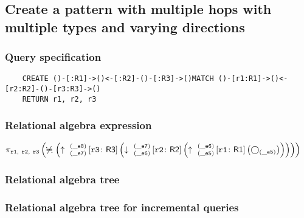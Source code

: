 	\subsection{Create a pattern with multiple hops with multiple types and varying directions}

	\subsubsection*{Query specification}

	\begin{lstlisting}
	CREATE ()-[:R1]->()<-[:R2]-()-[:R3]->()MATCH ()-[r1:R1]->()<-[r2:R2]-()-[r3:R3]->()
	RETURN r1, r2, r3
	\end{lstlisting}


	\subsubsection*{Relational algebra expression}

	$\projection{\var{r1},~\var{r2},~\var{r3}} \left(\alldifferent{} \left(\expandout{\_e7}{\_e8}{}{r3}{R3} \left(\expandin{\_e6}{\_e7}{}{r2}{R2} \left(\expandout{\_e5}{\_e6}{}{r1}{R1} \left(\getvertices{\_e5}{}\right)\right)\right)\right)\right)$

	\subsubsection*{Relational algebra tree}


	\subsubsection*{Relational algebra tree for incremental queries}

